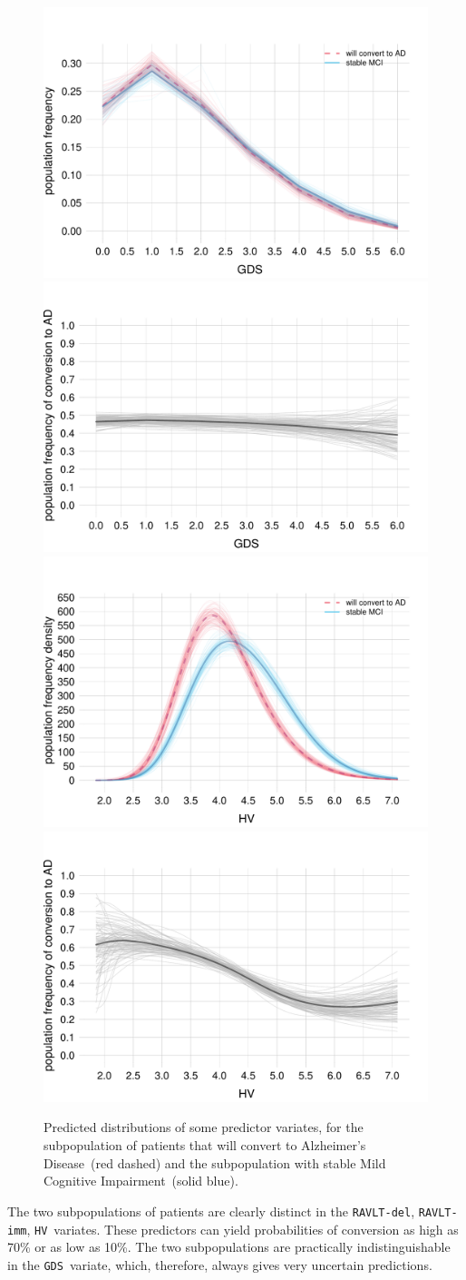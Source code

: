 \documentclass[utf8]{FrontiersinHarvard} %
\renewcommand*{\|}[1][]{\nonscript\:#1\vert\nonscript\:\mathopen{}}
\newcommand*{\hv}{\texttt{HV}}
\newcommand*{\gds}{\texttt{GDS}}
\newcommand*{\ravltimm}{\texttt{RAVLT-imm}}
\newcommand*{\ravltdel}{\texttt{RAVLT-del}}
\newcommand*{\ad}{Alzheimer's Disease}
\newcommand*{\mci}{Mild Cognitive Impairment}
\begin{document}
\begin{figure}[!t]
\\
\includegraphics[width=0.43\linewidth]{population_distr_GDS.pdf}%
\qquad%
\includegraphics[width=0.43\linewidth]{prob_conversion_GDS.pdf}%
\\
\includegraphics[width=0.43\linewidth]{population_distr_HV.pdf}%
\qquad%
\includegraphics[width=0.43\linewidth]{prob_conversion_HV.pdf}%
\caption{Predicted distributions of some predictor variates, for the subpopulation of patients that will convert to \ad\ (red dashed) and the subpopulation with stable \mci\ (solid blue).}\label{fig:marginal_pop_distributions}
\end{figure}%
%
The two subpopulations of patients are clearly distinct in the \ravltdel, \ravltimm, \hv\ variates. These predictors can yield probabilities of conversion as high as 70\% or as low as 10\%. The two subpopulations are practically indistinguishable in the \gds\ variate, which, therefore, always gives very uncertain predictions.
\end{document}
